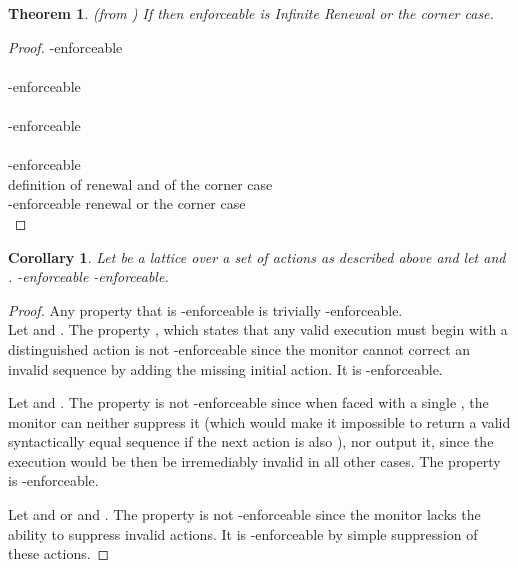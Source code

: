 \documentclass[12pt]{article}
\newtheorem{thm}{Theorem}
\newtheorem{cor}{Corollary}
\begin{document}
\begin{thm}
(from \cite{nonsafetyJournal}) If  then enforceable is Infinite Renewal or the corner case.
\end{thm}
\begin{proof}-enforceable  \\

\hspace*{\fill}\\

-enforceable  \\

\hspace*{\fill}\\

-enforceable  \\

\hspace*{\fill}\\

-enforceable  \\

\hspace*{\fill} definition of renewal and of the corner case \\

-enforceable renewal or the corner case  \\
\end{proof}


\begin{cor}\label{corr:1}
Let  be a lattice over a set of actions  as described above and let  and .
-enforceable    -enforceable.
\end{cor}
\begin{proof}
Any property that is -enforceable is trivially -enforceable.\\

Let  and  .
The property , which states that any valid execution must begin with a distinguished action  is not -enforceable since the monitor cannot correct an invalid sequence by adding the missing initial action. It is -enforceable.

Let   and  .
The property  is not -enforceable since when faced with a single , the monitor can neither suppress it (which would make it impossible to return a valid syntactically equal sequence if the next action is also ), nor output it, since the execution would be then be irremediably invalid in all other cases. The property is  -enforceable.

Let   and    or  and  .
The property  is not -enforceable since the monitor lacks the ability to suppress invalid  actions.  It is -enforceable by simple suppression of these actions.
\end{proof}
\end{document}
